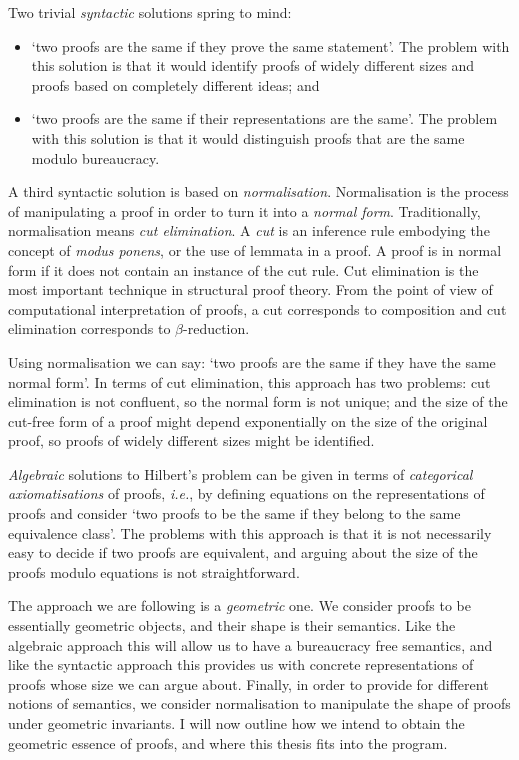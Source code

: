 Two trivial \emph{syntactic} solutions spring to mind:
\begin{itemize}
 \item `two proofs are the same if they prove the same statement'. The problem with this solution is that it would identify proofs of widely different sizes and proofs based on completely different ideas; and
 \item `two proofs are the same if their representations are the same'. The problem with this solution is that it would distinguish proofs that are the same modulo bureaucracy.
\end{itemize}

A third syntactic solution is based on \emph{normalisation}. Normalisation is the process of manipulating a proof in order to turn it into a \emph{normal form}. Traditionally, normalisation means \emph{cut elimination}. A \emph{cut} is an inference rule embodying the concept of \emph{modus ponens}, or the use of lemmata in a proof. A proof is in normal form if it does not contain an instance of the cut rule. Cut elimination is the most important technique in structural proof theory. From the point of view of computational interpretation of proofs, a cut corresponds to composition and cut elimination corresponds to $\beta$-reduction.

Using normalisation we can say: `two proofs are the same if they have the same normal form'. In terms of cut elimination, this approach has two problems: cut elimination is not confluent, so the normal form is not unique; and the size of the cut-free form of a proof might depend exponentially  on the size of the original proof, so proofs of widely different sizes might be identified.


\emph{Algebraic} solutions to Hilbert's problem can be given in terms of \emph{categorical axiomatisations} of proofs, \emph{i.e.}, by defining equations on the representations of proofs and consider `two proofs to be the same if they belong to the same equivalence class'. The problems with this approach is that it is not necessarily easy to decide if two proofs are equivalent, and arguing about the size of the proofs modulo equations is not straightforward.


The approach we are following is a \emph{geometric} one. We consider proofs to be essentially geometric objects, and their shape is their semantics. Like the algebraic approach this will allow us to have a bureaucracy free semantics, and like the syntactic approach this provides us with concrete representations of proofs whose size we can argue about. Finally, in order to provide for different notions of semantics, we consider normalisation to manipulate the shape of proofs under geometric invariants. I will now outline how we intend to obtain the geometric essence of proofs, and where this thesis fits into the program.


